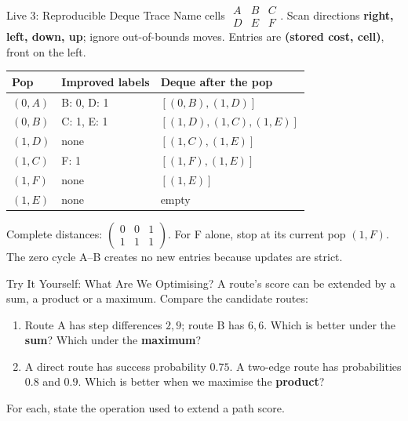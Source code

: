 \documentclass{beamer}
\begin{document}
\begin{frame}{Live 3: Reproducible Deque Trace}
  \small Name cells $\begin{smallmatrix}A&B&C\\D&E&F\end{smallmatrix}$.
  Scan directions \textbf{right, left, down, up}; ignore out-of-bounds moves.
  Entries are \textbf{(stored cost, cell)}, front on the left.
  \medskip
  \centering
  \begin{tabular}{@{}lll@{}}
    \toprule
    Pop & Improved labels & Deque after the pop \\
    \midrule
    $(0,A)$ & B: 0, D: 1 & $[(0,B),(1,D)]$ \\
    $(0,B)$ & C: 1, E: 1 & $[(1,D),(1,C),(1,E)]$ \\
    $(1,D)$ & none & $[(1,C),(1,E)]$ \\
    $(1,C)$ & F: 1 & $[(1,F),(1,E)]$ \\
    $(1,F)$ & none & $[(1,E)]$ \\
    $(1,E)$ & none & empty \\
    \bottomrule
  \end{tabular}
  \medskip
  \raggedright
  Complete distances: $\begin{pmatrix}0&0&1\\1&1&1\end{pmatrix}$.
  For F alone, stop at its current pop $(1,F)$.
  The zero cycle A--B creates no new entries because updates are strict.
\end{frame}

\begin{frame}{Try It Yourself: What Are We Optimising?}
  A route's score can be extended by a sum, a product or a maximum. Compare the candidate routes:
  \begin{enumerate}
    \item Route A has step differences $2,9$; route B has $6,6$.
      Which is better under the \textbf{sum}? Which under the \textbf{maximum}?
    \item A direct route has success probability $0.75$.
      A two-edge route has probabilities $0.8$ and $0.9$.
      Which is better when we maximise the \textbf{product}?
  \end{enumerate}
  \medskip
  For each, state the operation used to extend a path score.
\end{frame}
\end{document}
